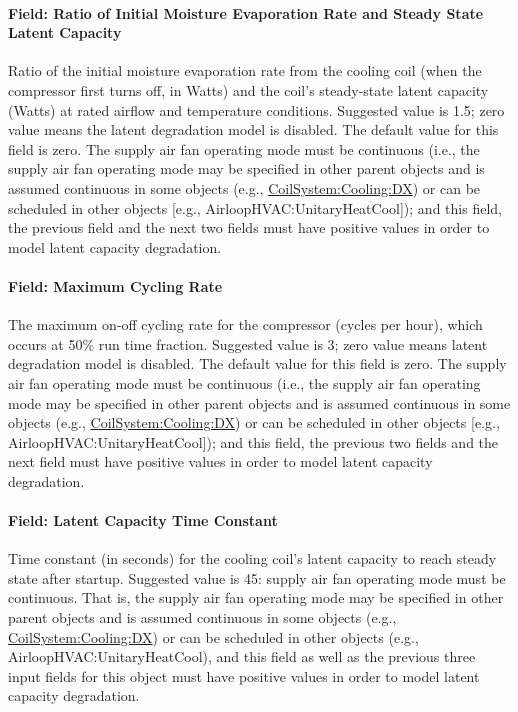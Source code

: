 \paragraph{Field: Ratio of Initial Moisture Evaporation Rate and Steady State Latent Capacity}\label{field-ratio-of-initial-moisture-evaporation-rate-and-steady-state-latent-capacity}

Ratio of the initial moisture evaporation rate from the cooling coil (when the compressor first turns off, in Watts) and the coil's steady-state latent capacity (Watts) at rated airflow and temperature conditions. Suggested value is 1.5; zero value means the latent degradation model is disabled. The default value for this field is zero. The supply air fan operating mode must be continuous (i.e., the supply air fan operating mode may be specified in other parent objects and is assumed continuous in some objects (e.g., \hyperref[coilsystemcoolingdx]{CoilSystem:Cooling:DX}) or can be scheduled in other objects {[}e.g., AirloopHVAC:UnitaryHeatCool{]}); and this field, the previous field and the next two fields must have positive values in order to model latent capacity degradation.

\paragraph{Field: Maximum Cycling Rate}\label{field-maximum-cycling-rate}

The maximum on-off cycling rate for the compressor (cycles per hour), which occurs at 50\% run time fraction. Suggested value is 3; zero value means latent degradation model is disabled. The default value for this field is zero. The supply air fan operating mode must be continuous (i.e., the supply air fan operating mode may be specified in other parent objects and is assumed continuous in some objects (e.g., \hyperref[coilsystemcoolingdx]{CoilSystem:Cooling:DX}) or can be scheduled in other objects {[}e.g., AirloopHVAC:UnitaryHeatCool{]}); and this field, the previous two fields and the next field must have positive values in order to model latent capacity degradation.

\paragraph{Field: Latent Capacity Time Constant}\label{field-latent-capacity-time-constant}

Time constant (in seconds) for the cooling coil's latent capacity to reach steady state after startup. Suggested value is 45: supply air fan operating mode must be continuous. That is, the supply air fan operating mode may be specified in other parent objects and is assumed continuous in some objects (e.g., \hyperref[coilsystemcoolingdx]{CoilSystem:Cooling:DX}) or can be scheduled in other objects (e.g., AirloopHVAC:UnitaryHeatCool), and this field as well as the previous three input fields for this object must have positive values in order to model latent capacity degradation.

